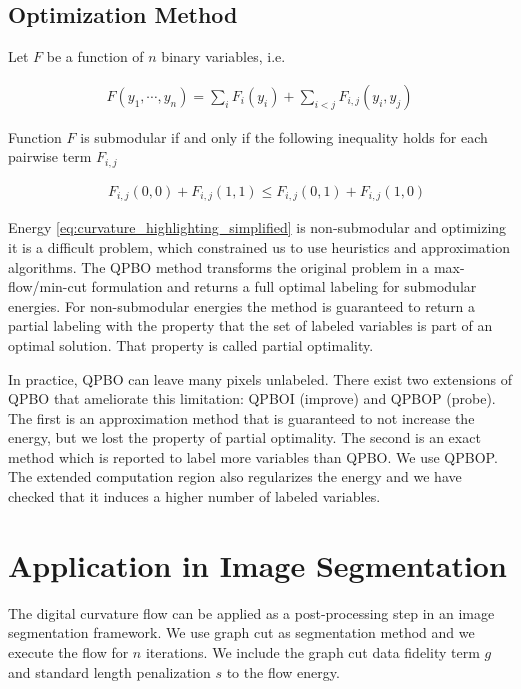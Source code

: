 \documentclass[runningheads]{llncs}
\begin{document}
\subsection{Optimization Method}\label{sec:optimization_method}

Let $F$ be a function of $n$ binary variables, i.e.

\begin{align*}
F(y_1,\cdots, y_n) = \sum_{i}{F_i(y_i)} + \sum_{i < j}{F_{i,j}(y_i,y_j)}
\end{align*}

Function $F$ is submodular if and only if the following inequality holds for each pairwise term $F_{i,j}$ \cite{kolmogorov04}

\begin{align*}
	\quad F_{i,j}(0,0) + F_{i,j}(1,1) \leq F_{i,j}(0,1) + F_{i,j}(1,0)
\end{align*}

Energy \eqref{eq:curvature_highlighting_simplified} is non-submodular and optimizing it is a difficult problem, which
constrained us to use heuristics and approximation algorithms. The QPBO method \cite{rother07} transforms the
original problem in a max-flow/min-cut formulation and returns a full optimal labeling for submodular energies. For
non-submodular energies the method is guaranteed to return a partial labeling with the property that the set of labeled
variables is part of an optimal solution. That property is called partial optimality.

In practice, QPBO can leave many pixels unlabeled. There exist two extensions of QPBO that ameliorate this limitation: QPBOI
(improve) and QPBOP (probe). The first is an approximation method that is guaranteed to not increase the energy, but we
lost the property of partial optimality. The second is an exact method which is reported to label more variables than
QPBO. We use QPBOP. The extended computation region also regularizes the energy and we have checked that it induces a
higher number of labeled variables.
	
\section{Application in Image Segmentation}

The digital curvature flow can be applied as a post-processing step in an image segmentation framework. We use graph cut
\cite{boykov01} as segmentation method and we execute the flow for $n$ iterations. We include the graph cut data
fidelity term $g$ and standard length penalization $s$ to the flow energy.
\end{document}
